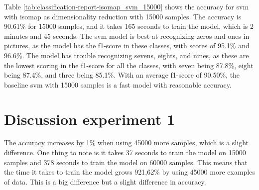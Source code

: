 
Table \ref{tab:classification-report-isomap_svm_15000} shows the accuracy for \gls{svm} with \gls{isomap} as dimensionality reduction with 15000 samples. The accuracy is 90.61\% for 15000 samples, and it takes 165 seconds to train the model, which is 2 minutes and 45 seconds. The \gls{svm} model is best at recognizing zeros and ones in pictures, as the model has the f1-score in these classes, with scores of 95.1\% and 96.6\%. The model has trouble recognizing sevens, eights, and nines, as these are the lowest scoring in the f1-score for all the classes, with seven being 87.8\%, eight being 87.4\%, and three being 85.1\%. With an average f1-score of 90.50\%, the baseline \gls{svm} with 15000 samples is a fast model with reasonable accuracy.

\section{Discussion experiment 1}\label{sec:discussion-experiment-1}
The accuracy increases by 1\% when using 45000 more samples, which is a slight difference. One thing to note is it takes 37 seconds to train the model on 15000 samples and 378 seconds to train the model on 60000 samples. This means that the time it takes to train the model grows 921,62\% by using 45000 more examples of data. This is a big difference but a slight difference in accuracy. 

